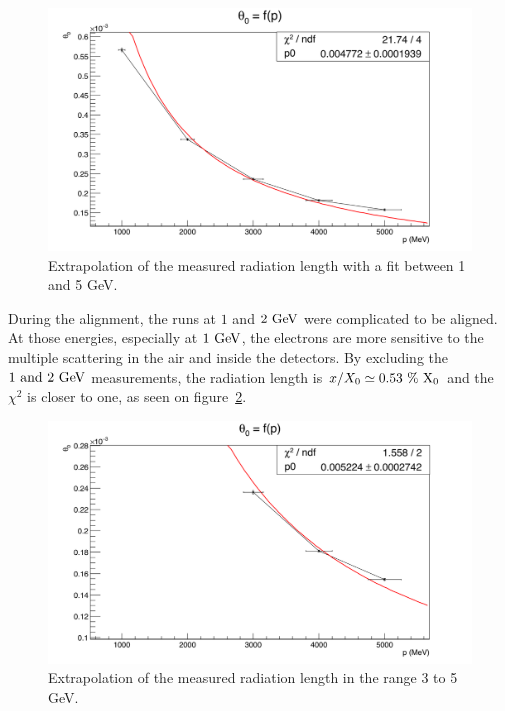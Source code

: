    \begin{figure}[!h]
     \centering
     \includegraphics[width = \textwidth]{Pictures/X0/theta0VsP_all.png}
     \caption{Extrapolation of the measured radiation length with a fit between 1 and 5 GeV.}
     \label{fig:theta0vsP_all}
   \end{figure}

   During the alignment, the runs at $1$ and $2~\rm{GeV}$ were complicated to be aligned.
   At those energies, especially at $1~\rm{GeV}$, the electrons are more sensitive to the multiple scattering in the air and inside the detectors.
   By excluding the $1~\rm{and}~2~\rm{GeV}$ measurements, the radiation length is $x/X_0 \simeq 0.53~\%~\rm{X_{0}}$ and the $\chi^2$ is closer to one, as seen on figure~\ref{fig:theta0vsP_3-5}.
   
   \begin{figure}[!h]
     \centering
     \includegraphics[width = \textwidth]{Pictures/X0/theta0VsP_3-5GeV.png}
     \caption{Extrapolation of the measured radiation length in the range 3 to 5 GeV.}
     \label{fig:theta0vsP_3-5}
   \end{figure}


